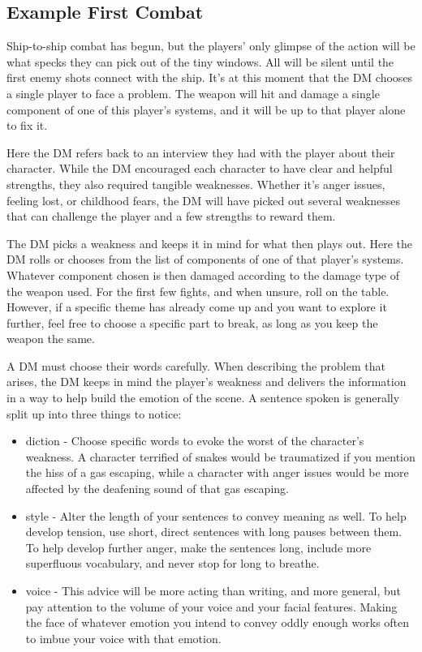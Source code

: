 \documentclass[a4paper]{article}
\begin{document}
\subsection{Example First Combat}

Ship-to-ship combat has begun, but the players' only glimpse of the action will be what specks they can pick out of the tiny windows. All will be silent until the first enemy shots connect with the ship. It's at this moment that the DM chooses a single player to face a problem. The weapon will hit and damage a single component of one of this player's systems, and it will be up to that player alone to fix it.

Here the DM refers back to an interview they had with the player about their character. While the DM encouraged each character to have clear and helpful strengths, they also required tangible weaknesses. Whether it's anger issues, feeling lost, or childhood fears, the DM will have picked out several weaknesses that can challenge the player and a few strengths to reward them.

The DM picks a weakness and keeps it in mind for what then plays out. Here the DM rolls or chooses from the list of components of one of that player's systems. Whatever component chosen is then damaged according to the damage type of the weapon used. For the first few fights, and when unsure, roll on the table. However, if a specific theme has already come up and you want to explore it further, feel free to choose a specific part to break, as long as you keep the weapon the same.

A DM must choose their words carefully. When describing the problem that arises, the DM keeps in mind the player's weakness and delivers the information in a way to help build the emotion of the scene. A sentence spoken is generally split up into three things to notice:
\begin{itemize}
\item diction - Choose specific words to evoke the worst of the character's weakness. A character terrified of snakes would be traumatized if you mention the hiss of a gas escaping, while a character with anger issues would be more affected by the deafening sound of that gas escaping.
\item style - Alter the length of your sentences to convey meaning as well. To help develop tension, use short, direct sentences with long pauses between them. To help develop further anger, make the sentences long, include more superfluous vocabulary, and never stop for long to breathe.
\item voice - This advice will be more acting than writing, and more general, but pay attention to the volume of your voice and your facial features. Making the face of whatever emotion you intend to convey oddly enough works often to imbue your voice with that emotion.
\end{itemize}
\end{document}
